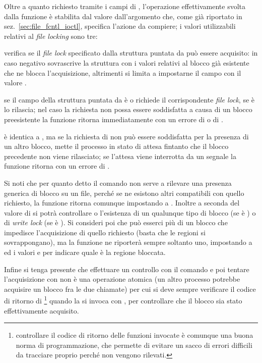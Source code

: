 Oltre a quanto richiesto tramite i campi di , l'operazione
effettivamente svolta dalla funzione è stabilita dal valore dall'argomento
 che, come già riportato in sez.~\ref{sec:file_fcntl_ioctl},
specifica l'azione da compiere; i valori utilizzabili relativi al \textit{file
  locking} sono tre:
\begin{basedescript}{\desclabelwidth{2.0cm}}
\item[\constd{F\_GETLK}] verifica se il \textit{file lock} specificato dalla
  struttura puntata da  può essere acquisito: in caso negativo
  sovrascrive la struttura  con i valori relativi al blocco già
  esistente che ne blocca l'acquisizione, altrimenti si limita a impostarne il
  campo  con il valore .
\item[\constd{F\_SETLK}] se il campo  della struttura puntata da
   è  o  richiede il
  corrispondente \textit{file lock}, se è  lo rilascia; nel
  caso la richiesta non possa essere soddisfatta a causa di un blocco
  preesistente la funzione ritorna immediatamente con un errore di
   o di .
\item[\constd{F\_SETLKW}] è identica a , ma se la richiesta di
  non può essere soddisfatta per la presenza di un altro blocco, mette il
  processo in stato di attesa fintanto che il blocco precedente non viene
  rilasciato; se l'attesa viene interrotta da un segnale la funzione ritorna
  con un errore di .
\end{basedescript}

Si noti che per quanto detto il comando  non serve a rilevare
una presenza generica di blocco su un file, perché se ne esistono altri
compatibili con quello richiesto, la funzione ritorna comunque impostando
 a .  Inoltre a seconda del valore di
 si potrà controllare o l'esistenza di un qualunque tipo di
blocco (se è ) o di \textit{write lock} (se è
). Si consideri poi che può esserci più di un blocco che
impedisce l'acquisizione di quello richiesto (basta che le regioni si
sovrappongano), ma la funzione ne riporterà sempre soltanto uno, impostando
 a  ed i valori  e 
per indicare quale è la regione bloccata.

Infine si tenga presente che effettuare un controllo con il comando
 e poi tentare l'acquisizione con  non è una
operazione atomica (un altro processo potrebbe acquisire un blocco fra le due
chiamate) per cui si deve sempre verificare il codice di ritorno di
\footnote{controllare il codice di ritorno delle funzioni invocate
  è comunque una buona norma di programmazione, che permette di evitare un
  sacco di errori difficili da tracciare proprio perché non vengono rilevati.}
quando la si invoca con , per controllare che il blocco sia
stato effettivamente acquisito.


